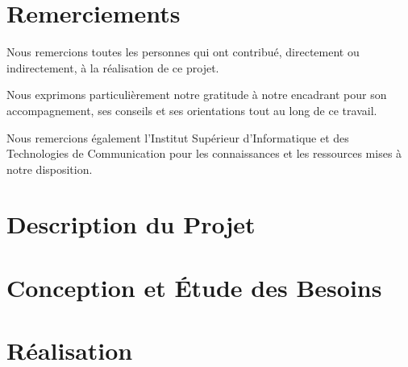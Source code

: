 \documentclass[12pt,a4paper,french]{report}
\begin{document}

\chapter*{Remerciements}

Nous remercions toutes les personnes qui ont contribué, directement ou
indirectement, à la réalisation de ce projet.

Nous exprimons particulièrement notre gratitude à notre encadrant pour
son accompagnement, ses conseils et ses orientations tout au long de
ce travail.

Nous remercions également l'Institut Supérieur d'Informatique et des
Technologies de Communication pour les connaissances et les ressources
mises à notre disposition.

\newpage


\tableofcontents

\newpage
\listoffigures



\chapter{Description du Projet}





\chapter{Conception et Étude des Besoins}





\chapter{Réalisation}
\end{document}
